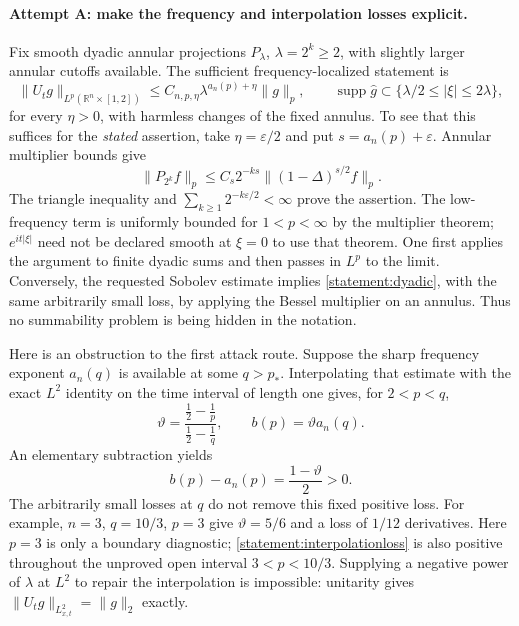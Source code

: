 \documentclass[11pt]{article}
\newcommand{\R}{\mathbb{R}}
\newcommand{\eps}{\varepsilon}
\begin{document}
	\paragraph{Attempt A: make the frequency and interpolation losses explicit.}
	Fix smooth dyadic annular projections $P_\lambda$, $\lambda=2^k\geq2$,
	with slightly larger annular cutoffs available. The sufficient
	frequency-localized statement is
	\begin{equation}\label{statement:dyadic}
		\|U_t g\|_{L^p(\R^n\times[1,2])}
		\leq C_{n,p,\eta}\lambda^{a_n(p)+\eta}\|g\|_p,
		\qquad \operatorname{supp}\widehat g\subset
		\{\lambda/2\leq|\xi|\leq2\lambda\},
	\end{equation}
	for every $\eta>0$, with harmless changes of the fixed annulus. To see
	that this suffices for the \emph{stated} assertion, take
	$\eta=\eps/2$ and put $s=a_n(p)+\eps$. Annular multiplier bounds give
	\[
	\|P_{2^k}f\|_p\leq C_s2^{-ks}\|(1-\Delta)^{s/2}f\|_p.
	\]
	The triangle inequality and
	$\sum_{k\geq1}2^{-k\eps/2}<\infty$ prove the assertion. The low-frequency
	term is uniformly bounded for $1<p<\infty$ by the multiplier theorem;
	$e^{it|\xi|}$ need not be declared smooth at $\xi=0$ to use that theorem.
	One first applies the argument to finite dyadic sums and then passes in
	$L^p$ to the limit. Conversely, the requested Sobolev estimate implies
	\eqref{statement:dyadic}, with the same arbitrarily small loss, by applying
	the Bessel multiplier on an annulus. Thus no summability problem is
	being hidden in the notation.
	
	Here is an obstruction to the first attack route. Suppose the sharp
	frequency exponent $a_n(q)$ is available at some $q>p_*$. Interpolating
	that estimate with the exact $L^2$ identity on the time interval of length
	one gives, for $2<p<q$,
	\[
	\vartheta=\frac{\frac12-\frac1p}{\frac12-\frac1q},\qquad
	b(p)=\vartheta a_n(q).
	\]
	An elementary subtraction yields
	\begin{equation}\label{statement:interpolationloss}
		b(p)-a_n(p)=\frac{1-\vartheta}{2}>0.
	\end{equation}
	The arbitrarily small losses at $q$ do not remove this fixed positive
	loss. For example, $n=3$, $q=10/3$, $p=3$ give
	$\vartheta=5/6$ and a loss of $1/12$ derivatives. Here $p=3$ is only a
	boundary diagnostic; \eqref{statement:interpolationloss} is also positive
	throughout the unproved open interval $3<p<10/3$. Supplying a negative
	power of $\lambda$ at $L^2$ to repair the interpolation is impossible:
	unitarity gives $\|U_tg\|_{L^2_{x,t}}=\|g\|_2$ exactly.
	
\end{document}
